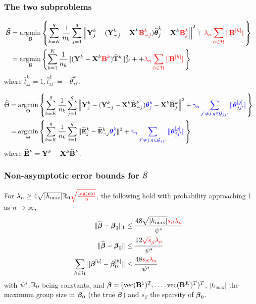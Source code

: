 \documentclass[10pt]{beamer}
\theoremstyle{definition}
\DeclareMathOperator*{\argmin}{argmin}
\DeclareMathOperator*{\ve}{vec}
\begin{document}
\begin{frame}
\frametitle{The two subproblems}
\begin{align*}
\widehat \cB &=
\argmin_{\cB} \left\{
\sum_{k=K}^q \frac{1}{n_k} \sum_{j=1}^q
\left\| \bfY_j^k - ( \bfY_{-j}^k - \bfX^k {\colr \bfB_{-j}^k} ) \widehat \bftheta_j^k
- \bfX^k {\colr \bfB_j^k} \right\|^2
+ {\colr \lambda_n \sum_{h \in \cH} \| \bfB^{[h]} \|} \right\}\\
&= \argmin_{\cB} \left\{ \sum_{k=1}^K \frac{1}{n_k}
\| (\bfY^k - \bfX^k {\colr \bfB^k}) \widehat \bfT^k \|_F^2 +
+ {\colr \lambda_n \sum_{h \in \cH} \| \bfB^{[h]} \|} \right\}
\end{align*}
%
where $\widehat t_{jj}^k = 1, \widehat t_{jj'}^k = - \widehat \theta_{jj'}^k$.

\begin{align*}
\widehat \Theta &=
\argmin_{\Theta} \left\{ \sum_{k=K}^q \frac{1}{n_k} \sum_{j=1}^q
\left\| \bfY_j^k - ( \bfY_{-j}^k - \bfX^k \widehat \bfB_{-j}^k) {\colb \bftheta_j^k}
- \bfX^k \widehat \bfB_j^k \right\|^2 
+ {\colb \gamma_n \sum_{j' \neq j, g \in \cG_{jj'}} \| \bftheta_{jj'}^{[g]} \|} \right\}\\
&= \argmin_{\Theta} \left\{ 
\sum_{k=K}^q \frac{1}{n_k} \sum_{j=1}^q
\| \widehat \bfE_j^k - \widehat \bfE_{-j}^k {\colb \bftheta_j^k} \|^2
+ {\colb \gamma_n \sum_{j' \neq j, g \in \cG_{jj'}} \| \bftheta_{jj'}^{[g]} \|} \right\}
\end{align*}
%
where $\widehat {{\mathbf{E}}}^k = {\mathbf{Y}}^k - {\mathbf{X}}^k \widehat {{\mathbf{B}}}^k$.

\end{frame}


\begin{frame}
\frametitle{Non-asymptotic error bounds for $\widehat {{\cal{B}}}$}

For $\lambda_n \geq 4 \sqrt{| h_{\max} |} {\mathbb{R}}_0 {\color{red} \sqrt{ \frac{ \log(pq)}{n}}}$, the following hold with probability approaching 1 as $n \rightarrow \infty$,
%
\begin{align*}
\| \widehat {{\boldsymbol{\beta}}} - {\boldsymbol{\beta}}_0 \|_1 & \leq \frac{48 \sqrt{ | h_{\max} |} {\color{red} s_\beta \lambda_n}}{ \psi^*} \\
\| \widehat {{\boldsymbol{\beta}}} - {\boldsymbol{\beta}}_0 \| & \leq \frac{12 {\color{red} \sqrt s_\beta \lambda_n}}{ \psi^*} \\
\sum_{h \in {\cal{H}}} \| {\boldsymbol{\beta}}^{[h]} - {\boldsymbol{\beta}}_0^{[h]} \| & \leq \frac{48 {\color{red} s_\beta \lambda_n}}{ \psi^*}
\end{align*}
%
with $\psi^*, {\mathbb{R}}_0$ being constants, and $\bfbeta = (\ve(\bfB^1)^T, \ldots, \ve(\bfB^K)^T)^T$, $| h_{\max} |$ the maximum group size in ${\boldsymbol{\beta}}_0$ (the true ${\boldsymbol{\beta}}$) and $s_\beta$ the sparsity of ${\boldsymbol{\beta}}_0$.
\end{frame}
\end{document}
